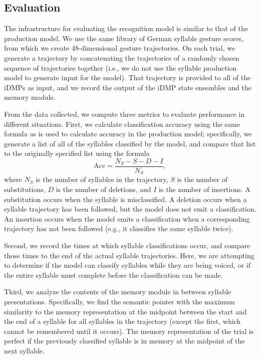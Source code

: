 \subsection{Evaluation}

The infrastructure for evaluating
the recognition model
is similar to that of the production model.
We use the same library
of German syllable gesture scores,
from which we create
48-dimensional gesture trajectories.
On each trial,
we generate a trajectory
by concatenating the trajectories
of a randomly chosen sequence
of trajectories together
(i.e., we do not use the
syllable production model
to generate input for the model).
That trajectory is provided
to all of the iDMPs as input,
and we record the output of the
iDMP state ensembles
and the memory module.

From the data collected,
we compute three metrics
to evaluate performance
in different situations.
First, we calculate
classification accuracy
using the same formula
as is used to calculate
accuracy in the production model;
specifically,
we generate a list of all of the
syllables classified by the model,
and compare that list to the
originally specified list
using the formula
\begin{equation*}
  \text{Acc} = \frac{N_S - S - D - I}{N_S},
\end{equation*}
where $N_S$ is the number of syllables
in the trajectory,
$S$ is the number of substitutions,
$D$ is the number of deletions,
and $I$ is the number of insertions.
A substitution occurs when
the syllable is misclassified.
A deletion occurs when
a syllable trajectory has been followed,
but the model does not emit a classification.
An insertion occurs
when the model emits a classification
when a corresponding trajectory has not been followed
(e.g., it classifies the same syllable twice).

Second, we record the times at which
syllable classifications occur,
and compare those times
to the end of the actual syllable trajectories.
Here, we are attempting to determine
if the model can classify syllables
while they are being voiced,
or if the entire syllable must complete
before the classification can be made.

Third, we analyze the contents
of the memory module
in between syllable presentations.
Specifically,
we find the semantic pointer
with the maximum similarity
to the memory representation
at the midpoint between
the start and the end of a syllable
for all syllables in the trajectory
(except the first,
which cannot be remembered until it occurs).
The memory representation of the trial
is perfect if the
previously classified syllable
is in memory at the midpoint
of the next syllable.

